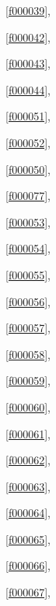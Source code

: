 \noindent\filesourcenumbernameone\ \ref{f000039},\ \pageref{f000039}%

\noindent\filesourcenumbernameone\ \ref{f000042},\ \pageref{f000042}%

\noindent\filesourcenumbernameone\ \ref{f000043},\ \pageref{f000043}%

\noindent\filesourcenumbernameone\ \ref{f000044},\ \pageref{f000044}%

\noindent\filesourcenumbernameone\ \ref{f000051},\ \pageref{f000051}%

\noindent\filesourcenumbernameone\ \ref{f000052},\ \pageref{f000052}%

\noindent\filesourcenumbernameone\ \ref{f000050},\ \pageref{f000050}%

\noindent\filesourcenumbernameone\ \ref{f000077},\ \pageref{f000077}%

\noindent\filesourcenumbernameone\ \ref{f000053},\ \pageref{f000053}%

\noindent\filesourcenumbernameone\ \ref{f000054},\ \pageref{f000054}%

\noindent\filesourcenumbernameone\ \ref{f000055},\ \pageref{f000055}%

\noindent\filesourcenumbernameone\ \ref{f000056},\ \pageref{f000056}%

\noindent\filesourcenumbernameone\ \ref{f000057},\ \pageref{f000057}%

\noindent\filesourcenumbernameone\ \ref{f000058},\ \pageref{f000058}%

\noindent\filesourcenumbernameone\ \ref{f000059},\ \pageref{f000059}%

\noindent\filesourcenumbernameone\ \ref{f000060},\ \pageref{f000060}%

\noindent\filesourcenumbernameone\ \ref{f000061},\ \pageref{f000061}%

\noindent\filesourcenumbernameone\ \ref{f000062},\ \pageref{f000062}%

\noindent\filesourcenumbernameone\ \ref{f000063},\ \pageref{f000063}%

\noindent\filesourcenumbernameone\ \ref{f000064},\ \pageref{f000064}%

\noindent\filesourcenumbernameone\ \ref{f000065},\ \pageref{f000065}%

\noindent\filesourcenumbernameone\ \ref{f000066},\ \pageref{f000066}%

\noindent\filesourcenumbernameone\ \ref{f000067},\ \pageref{f000067}%

